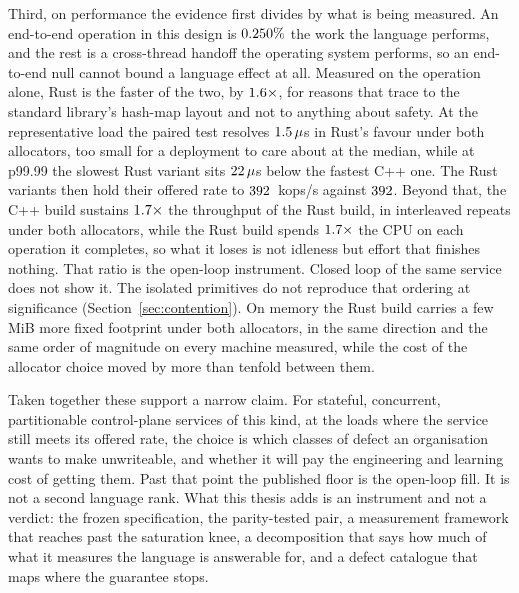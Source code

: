 \documentclass[english,oneside,a4paper,censored,csm,software-track-2020]{HYthesisML}
\begin{document}
Third, on performance the evidence first divides by what is being measured. An end-to-end
operation in this design is $0.250\%$ the work the language performs, and the
rest is a cross-thread handoff the operating system performs, so an end-to-end null cannot
bound a language effect at all. Measured on the operation alone, Rust is the faster of the
two, by $1.6\times$, for reasons that trace to the standard library's hash-map
layout and not to anything about safety. At the representative load the paired test
resolves $1.5\,\mu$s in Rust's favour under both allocators, too small for a
deployment to care about at the median, while at p99.99 the slowest Rust variant sits
$22\,\mu$s below the fastest C++ one. The Rust variants then hold their offered
rate to $392$~kops/s against $392$. Beyond that, the C++ build
sustains $1.7\times$ the throughput of the Rust build, in \OverloadThrAgree{}
interleaved repeats under both allocators, while the Rust build spends
$1.7\times$ the CPU on each operation it completes, so what it loses is
not idleness but effort that finishes nothing.
That ratio is the open-loop instrument.
Closed loop of the same service does not show it. The isolated primitives do not reproduce
that ordering at significance (Section~\ref{sec:contention}). On memory the Rust build
carries a few MiB more fixed footprint under both allocators, in the same direction and
the same order of magnitude on every machine measured, while the cost of the allocator
choice moved by more than tenfold between them.

Taken together these support a narrow claim. For stateful, concurrent, partitionable
control-plane services of this kind, at the loads where the service still meets its offered
rate, the choice is which classes of defect an organisation wants to make unwriteable, and
whether it will pay the engineering and learning cost of getting them. Past that point the published floor is the
open-loop fill. It is not a second language rank. What this thesis adds is an instrument
and not a verdict: the frozen specification, the parity-tested pair, a measurement
framework that reaches past the saturation knee, a decomposition that says how much of what
it measures the language is answerable for, and a defect catalogue that maps where the
guarantee stops.
\end{document}
